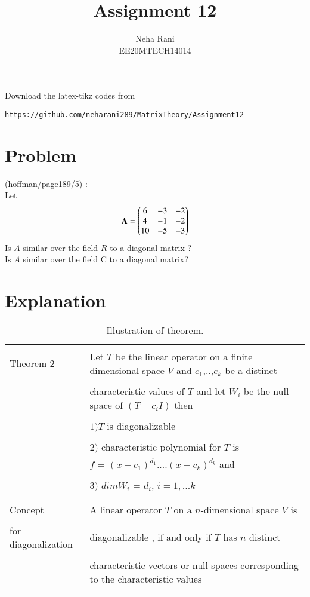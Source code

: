 \documentclass[journal,12pt]{IEEEtran}
\begin{document}
     \def\rightbox#1{\makebox[0in][r]{#1}}
     \def\centbox#1{\makebox[0in]{#1}}
     \def\topbox#1{\raisebox{-\baselineskip}[0in][0in]{#1}}
     \def\midbox#1{\raisebox{-0.5\baselineskip}[0in][0in]{#1}}
\vspace{3cm}
\title{Assignment 12}
\author{Neha Rani\\EE20MTECH14014}
\maketitle
\bigskip
\renewcommand{\thefigure}{\theenumi}
\renewcommand{\thetable}{\theenumi}
%
Download the latex-tikz codes from 
%
\begin{lstlisting}
https://github.com/neharani289/MatrixTheory/Assignment12
\end{lstlisting}
\section{\textbf{Problem}}
(hoffman/page189/5) : \\
%
Let
\begin{align}
\mathbf{A}=\begin{pmatrix}6&-3&-2\\4&-1&-2\\10&-5&-3\end{pmatrix}
\end{align}
Is $A$ similar over the field $R$ to a diagonal matrix ? \\Is $A$ similar over the field C to a diagonal matrix?
%
%
%
\section{\textbf{Explanation}}
\renewcommand{\thetable}{1}
\begin{longtable}{|l|l|}
\hline
\multirow{3}{*}{Theorem 2} & \\
& Let $T$ be the linear operator on a finite dimensional space $V$ and $c_1$,..,$c_k$ be a distinct \\
&\\
&characteristic values of $T$ and let $W_i$ be the null space of $(T-c_iI)$ then \\
&\\
& $1)T$ is diagonalizable \\
&\\
& $2)$ characteristic polynomial for $T$ is \\
& $f$ = $(x-c_1)^{d_1}$....$(x-c_k)^{d_k}$ and \\
&\\
& $3)$ $dim W_i$ = $d_i$, $i= 1,...k$\\
&\\
\hline
\multirow{3}{*}{Concept} & \\
&
A linear operator $T$ on a $n$-dimensional space $V$ is\\ 
&\\ for diagonalization
& diagonalizable , if and only if $T$ has $n$ distinct \\
&\\
& characteristic vectors or null spaces corresponding to the characteristic values\\
\hline
\caption{Illustration of theorem.}
\label{table:1}
\end{longtable}
\newpage
\end{document}
